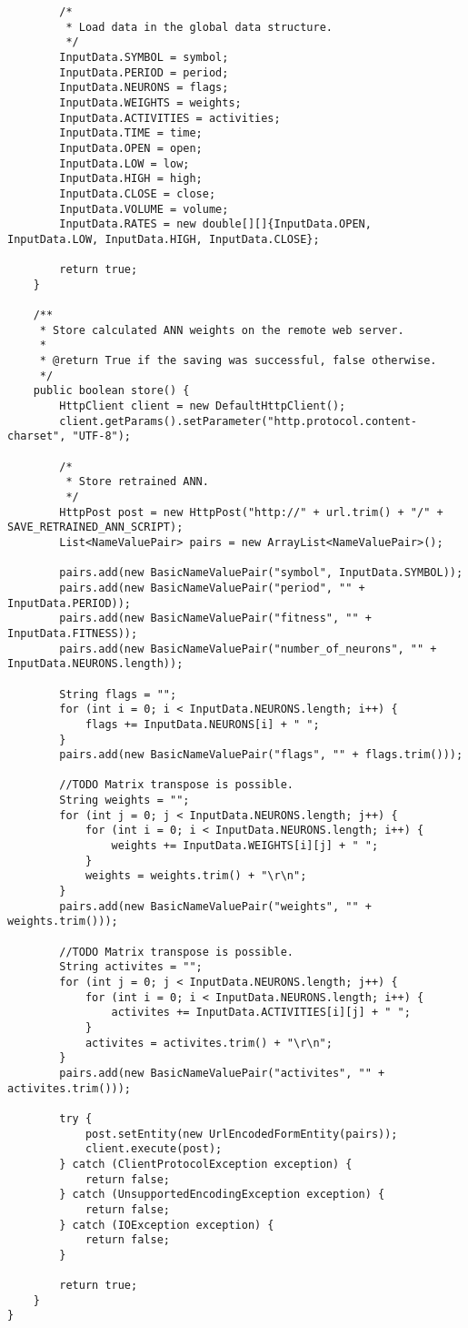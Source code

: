 \begin{verbatim}
        /*
         * Load data in the global data structure.
         */
        InputData.SYMBOL = symbol;
        InputData.PERIOD = period;
        InputData.NEURONS = flags;
        InputData.WEIGHTS = weights;
        InputData.ACTIVITIES = activities;
        InputData.TIME = time;
        InputData.OPEN = open;
        InputData.LOW = low;
        InputData.HIGH = high;
        InputData.CLOSE = close;
        InputData.VOLUME = volume;
        InputData.RATES = new double[][]{InputData.OPEN, InputData.LOW, InputData.HIGH, InputData.CLOSE};

        return true;
    }

    /**
     * Store calculated ANN weights on the remote web server.
     *
     * @return True if the saving was successful, false otherwise.
     */
    public boolean store() {
        HttpClient client = new DefaultHttpClient();
        client.getParams().setParameter("http.protocol.content-charset", "UTF-8");

        /*
         * Store retrained ANN.
         */
        HttpPost post = new HttpPost("http://" + url.trim() + "/" + SAVE_RETRAINED_ANN_SCRIPT);
        List<NameValuePair> pairs = new ArrayList<NameValuePair>();

        pairs.add(new BasicNameValuePair("symbol", InputData.SYMBOL));
        pairs.add(new BasicNameValuePair("period", "" + InputData.PERIOD));
        pairs.add(new BasicNameValuePair("fitness", "" + InputData.FITNESS));
        pairs.add(new BasicNameValuePair("number_of_neurons", "" + InputData.NEURONS.length));

        String flags = "";
        for (int i = 0; i < InputData.NEURONS.length; i++) {
            flags += InputData.NEURONS[i] + " ";
        }
        pairs.add(new BasicNameValuePair("flags", "" + flags.trim()));

        //TODO Matrix transpose is possible.
        String weights = "";
        for (int j = 0; j < InputData.NEURONS.length; j++) {
            for (int i = 0; i < InputData.NEURONS.length; i++) {
                weights += InputData.WEIGHTS[i][j] + " ";
            }
            weights = weights.trim() + "\r\n";
        }
        pairs.add(new BasicNameValuePair("weights", "" + weights.trim()));

        //TODO Matrix transpose is possible.
        String activites = "";
        for (int j = 0; j < InputData.NEURONS.length; j++) {
            for (int i = 0; i < InputData.NEURONS.length; i++) {
                activites += InputData.ACTIVITIES[i][j] + " ";
            }
            activites = activites.trim() + "\r\n";
        }
        pairs.add(new BasicNameValuePair("activites", "" + activites.trim()));

        try {
            post.setEntity(new UrlEncodedFormEntity(pairs));
            client.execute(post);
        } catch (ClientProtocolException exception) {
            return false;
        } catch (UnsupportedEncodingException exception) {
            return false;
        } catch (IOException exception) {
            return false;
        }

        return true;
    }
}
\end{verbatim}

